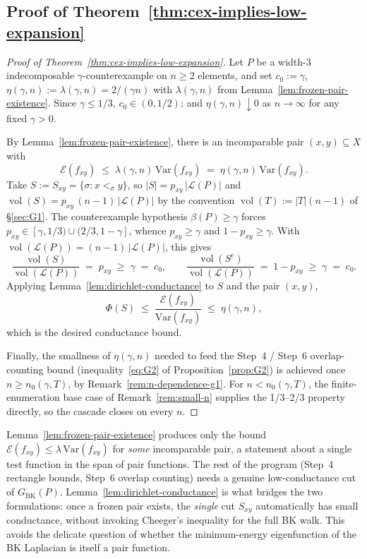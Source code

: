 \subsection{Proof of Theorem~\ref{thm:cex-implies-low-expansion}}

\begin{proof}[Proof of Theorem~\ref{thm:cex-implies-low-expansion}]
Let $P$ be a width-$3$ indecomposable $\gamma$-counterexample on
$n \ge 2$ elements, and set $c_0 := \gamma$,
$\eta(\gamma, n) := \lambda(\gamma, n) = 2/(\gamma n)$ with
$\lambda(\gamma, n)$ from Lemma~\ref{lem:frozen-pair-existence}. Since
$\gamma \le 1/3$, $c_0 \in (0, 1/2)$; and
$\eta(\gamma, n) \downarrow 0$ as $n \to \infty$ for any fixed
$\gamma > 0$.

By Lemma~\ref{lem:frozen-pair-existence}, there is an incomparable
pair $(x, y) \subseteq X$ with
\[
  \mathcal{E}(f_{xy})
  \;\le\; \lambda(\gamma, n)\,\mathrm{Var}(f_{xy})
  \;=\; \eta(\gamma, n)\,\mathrm{Var}(f_{xy}).
\]
Take $S := S_{xy} = \{\sigma : x <_\sigma y\}$, so $|S| = p_{xy}\,
|\mathcal L(P)|$ and $\operatorname{vol}(S) = p_{xy}\,(n-1)\,
|\mathcal L(P)|$ by the convention
$\operatorname{vol}(T) := |T|(n-1)$ of \S\ref{sec:G1}. The counterexample
hypothesis $\beta(P) \ge \gamma$ forces
$p_{xy} \in [\gamma, 1/3) \cup (2/3, 1-\gamma]$, whence $p_{xy} \ge
\gamma$ and $1 - p_{xy} \ge \gamma$. With
$\operatorname{vol}(\mathcal L(P)) = (n-1)\,|\mathcal L(P)|$, this gives
\[
  \frac{\operatorname{vol}(S)}{\operatorname{vol}(\mathcal L(P))}
  \;=\; p_{xy}
  \;\ge\; \gamma
  \;=\; c_0,
  \qquad
  \frac{\operatorname{vol}(S^c)}{\operatorname{vol}(\mathcal L(P))}
  \;=\; 1 - p_{xy}
  \;\ge\; \gamma
  \;=\; c_0.
\]
Applying Lemma~\ref{lem:dirichlet-conductance} to $S$ and the pair
$(x,y)$,
\[
  \Phi(S) \;\le\;
  \frac{\mathcal{E}(f_{xy})}{\mathrm{Var}(f_{xy})}
  \;\le\; \eta(\gamma, n),
\]
which is the desired conductance bound.

Finally, the smallness of $\eta(\gamma, n)$ needed to feed the Step~4
/ Step~6 overlap-counting bound (inequality~\eqref{eq:G2} of
Proposition~\ref{prop:G2}) is achieved once $n \ge n_0(\gamma, T)$, by
Remark~\ref{rem:n-dependence-g1}. For $n < n_0(\gamma, T)$, the
finite-enumeration base case of Remark~\ref{rem:small-n} supplies the
1/3--2/3 property directly, so the cascade closes on every $n$.
\end{proof}

\begin{remark}
Lemma~\ref{lem:frozen-pair-existence} produces only the bound
$\mathcal{E}(f_{xy}) \le \lambda\,\mathrm{Var}(f_{xy})$ for \emph{some}
incomparable pair, a statement about a single test function in the
span of pair functions. The rest of the program (Step~4 rectangle
bounds, Step~6 overlap counting) needs a genuine low-conductance cut
of $G_{\mathrm{BK}}(P)$. Lemma~\ref{lem:dirichlet-conductance} is what
bridges the two formulations: once a frozen pair exists, the
\emph{single} cut $S_{xy}$ automatically has small conductance, without
invoking Cheeger's inequality for the full BK walk. This avoids the
delicate question of whether the minimum-energy eigenfunction of the
BK Laplacian is itself a pair function.
\end{remark}

